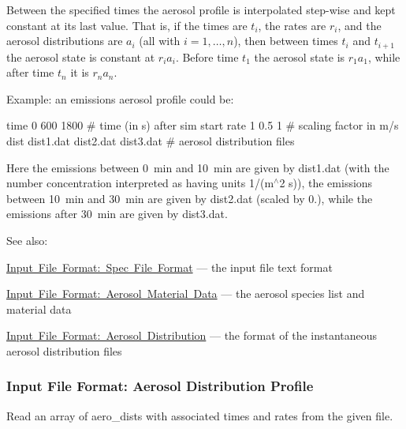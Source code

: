 Between the specified times the aerosol profile is interpolated step-\/wise and kept constant at its last value. That is, if the times are $t_i$, the rates are $r_i$, and the aerosol distributions are $a_i$ (all with $i = 1,\ldots,n$), then between times $t_i$ and $t_{i+1}$ the aerosol state is constant at $r_i a_i$. Before time $t_1$ the aerosol state is $r_1 a_1$, while after time $t_n$ it is $r_n a_n$.

Example\+: an emissions aerosol profile could be\+: 
\begin{DoxyPre}
 time  0          600        1800       \# time (in s) after sim start
 rate  1          0.5        1          \# scaling factor in m/s
 dist  dist1.dat  dist2.dat  dist3.dat  \# aerosol distribution files
 \end{DoxyPre}
 Here the emissions between 0~min and 10~min are given by {\ttfamily dist1.\+dat} (with the number concentration interpreted as having units 1/(m$^\wedge$2 s)), the emissions between 10~min and 30~min are given by {\ttfamily dist2.\+dat} (scaled by 0.), while the emissions after 30~min are given by {\ttfamily dist3.\+dat}.

See also\+:
\begin{DoxyItemize}
\item \mbox{\hyperlink{spec_file_format}{Input File Format\+: Spec File Format}} --- the input file text format
\item \mbox{\hyperlink{input_format_aero_data}{Input File Format\+: Aerosol Material Data}} --- the aerosol species list and material data
\item \mbox{\hyperlink{input_format_aero_dist}{Input File Format\+: Aerosol Distribution}} --- the format of the instantaneous aerosol distribution files 
\end{DoxyItemize}\hypertarget{input_format_aero_dist_profile}{}\subsubsection{Input File Format\+: Aerosol Distribution Profile}\label{input_format_aero_dist_profile}
Read an array of aero\+\_\+dists with associated times and rates from the given file.


